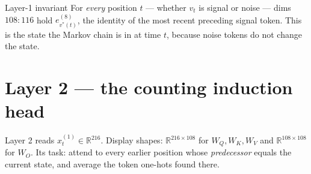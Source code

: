 \documentclass[11pt]{article}
\newcommand{\R}{\mathbb{R}}
\newcommand{\Wq}{W_Q}
\newcommand{\Wk}{W_K}
\newcommand{\Wv}{W_V}
\newcommand{\Wo}{W_O}
\begin{document}
\begin{warningbox}{Layer-1 invariant}
For \emph{every} position $t$ --- whether $v_t$ is signal or noise --- dims $108{:}116$ hold
$e^{(8)}_{v^*(t)}$, the identity of the most recent preceding signal token. This is the state the
Markov chain is in at time $t$, because noise tokens do not change the state.
\end{warningbox}

\section{Layer 2 --- the counting induction head}

Layer 2 reads $x^{(1)}_t\in\R^{216}$. Display shapes: $\R^{216\times108}$ for $\Wq,\Wk,\Wv$ and
$\R^{108\times108}$ for $\Wo$. Its task: attend to every earlier position whose \emph{predecessor}
equals the current state, and average the token one-hots found there.
\end{document}
